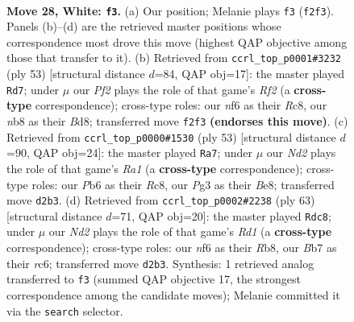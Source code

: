 \documentclass[11pt]{article}
\begin{document}
\clearpage

\begin{figure}[p]\centering
\begin{subfigure}{0.46\textwidth}\centering
\resizebox{\linewidth}{!}{%
\newchessgame
\chessboard[
  setfen={1n3r1k/1B4b1/rP3n2/p3p3/b1P3p1/4N1P1/3NRP2/1RB3K1 w - - 0 28},
  showmover=false,
  pgfstyle=straightmove, color=movearrow, markmove={f2-f3}
]}
\caption{}
\end{subfigure}\hfill
\begin{subfigure}{0.46\textwidth}\centering
\resizebox{\linewidth}{!}{%
\newchessgame
\chessboard[
  setfen={2rb2k1/1p3r1p/5np1/4p1B1/p1P5/P4P2/1P1NR2P/1K1R4 b - - 4 27},
  showmover=false,
  pgfstyle=straightmove, color=movearrow, markmove={f7-d7}
]}
\caption{}
\end{subfigure}
\\[4pt]
\begin{subfigure}{0.46\textwidth}\centering
\resizebox{\linewidth}{!}{%
\newchessgame
\chessboard[
  setfen={r1r1b1k1/5p1p/4p3/2b1n1P1/3RP3/1PN5/2PKBB1P/5R2 b - - 0 27},
  showmover=false,
  pgfstyle=straightmove, color=movearrow, markmove={a8-a7}
]}
\caption{}
\end{subfigure}\hfill
\begin{subfigure}{0.46\textwidth}\centering
\resizebox{\linewidth}{!}{%
\newchessgame
\chessboard[
  setfen={1r1r1bk1/6pp/2R2n2/p2p1N2/3Bn1P1/8/PP2B2P/5R1K b - - 5 32},
  showmover=false,
  pgfstyle=straightmove, color=movearrow, markmove={d8-c8}
]}
\caption{}
\end{subfigure}
\caption{\textbf{Move 28, White: \texttt{f3}.} (a) Our position; Melanie plays \texttt{f3} (\texttt{f2f3}). Panels (b)--(d) are the retrieved master positions whose correspondence most drove this move (highest QAP objective among those that transfer to it). (b) Retrieved from \texttt{ccrl\_top\_p0001\#3232} (ply 53) [structural distance $d$=84, QAP obj=17]: the master played \texttt{Rd7}; under $\mu$ our \emph{Pf2} plays the role of that game's \emph{Rf2} (a \textbf{cross-type} correspondence); cross-type roles: our \emph{n}f6 as their \emph{R}c8, our \emph{n}b8 as their \emph{B}d8; transferred move \texttt{f2f3} \textbf{(endorses this move)}. (c) Retrieved from \texttt{ccrl\_top\_p0000\#1530} (ply 53) [structural distance $d$=90, QAP obj=24]: the master played \texttt{Ra7}; under $\mu$ our \emph{Nd2} plays the role of that game's \emph{Ra1} (a \textbf{cross-type} correspondence); cross-type roles: our \emph{P}b6 as their \emph{R}c8, our \emph{P}g3 as their \emph{B}e8; transferred move \texttt{d2b3}. (d) Retrieved from \texttt{ccrl\_top\_p0002\#2238} (ply 63) [structural distance $d$=71, QAP obj=20]: the master played \texttt{Rdc8}; under $\mu$ our \emph{Nd2} plays the role of that game's \emph{Rd1} (a \textbf{cross-type} correspondence); cross-type roles: our \emph{n}f6 as their \emph{R}b8, our \emph{B}b7 as their \emph{r}c6; transferred move \texttt{d2b3}. Synthesis: 1 retrieved analog transferred to \texttt{f3} (summed QAP objective 17, the strongest correspondence among the candidate moves); Melanie committed it via the \texttt{search} selector.}
\label{fig:thought-m54}
\end{figure}
\end{document}
